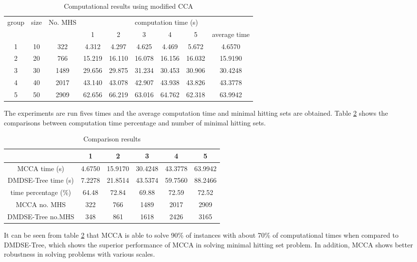 \begin{table}[h!]
	\begin{center}
		\caption{Computational results using modified CCA}
		\label{tab:tab2}
		\begin{tabular}{ccccccccc}
			\hline
			\multirow{2}{*}{group} & \multirow{2}{*}{size} & \multirow{2}{*}{No. MHS} & \multicolumn{6}{c}{computation time (s)} \\
			\cline{4-9}
			& & & 1 & 2 & 3 & 4 &5 & average time \\
			\hline 
			1 & 10 & 322  &  4.312 & 4.297   &  4.625 & 4.469  & 5.672   & 4.6570   \\
			2 & 20 & 766  & 15.219 &16.110   & 16.078 & 16.156 & 16.032  & 15.9190  \\
			3 & 30 & 1489 & 29.656 & 29.875  & 31.234 & 30.453 & 30.906  & 30.4248  \\
			4 & 40 & 2017 & 43.140 &  43.078 & 42.907 & 43.938 &  43.826 & 43.3778  \\
			5 & 50 & 2909 & 62.656 &  66.219 & 63.016 & 64.762 & 62.318  & 63.9942  \\
			\hline
		\end{tabular}
	\end{center}
\end{table}


The experiments are run fives times and the average computation time and minimal hitting sets are obtained.
Table \ref{tab:tab3} shows the comparisons between computation time percentage and number of minimal hitting sets.

\begin{table}[h!]
	\begin{center}
		\caption{Comparison results}
		\label{tab:tab3}
		\begin{tabular}{cccccc}
			\hline
			& 1 & 2 & 3 &4 & 5 \\
			\hline
			MCCA time (s)        & 4.6750 & 15.9170 & 30.4248 & 43.3778 & 63.9942 \\
			DMDSE-Tree time (s)  & 7.2278 & 21.8514 & 43.5374 & 59.7560 & 88.2466 \\
			time percentage (\%) & 64.48  & 72.84   & 69.88   & 72.59   &  72.52  \\
			MCCA no. MHS         & 322    &  766    &  1489   & 2017    & 2909  \\
			DMDSE-Tree no.MHS    & 348    & 861     & 1618    & 2426    & 3165 \\
			\hline
		\end{tabular}
	\end{center}
\end{table}


It can be seen from table \ref{tab:tab3} that MCCA is able to solve 90\% of instances with about 70\% of computational times when compared to DMDSE-Tree, which shows the superior performance of MCCA in solving minimal hitting set problem.
In addition, MCCA shows better robustness in solving problems with various scales.